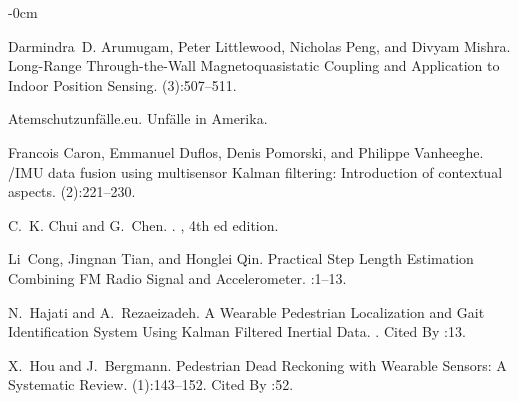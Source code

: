 \documentclass[engproc,conferenceproceedings,submit,pdftex,moreauthors]{Definitions/mdpi}
\begin{document}
\begin{adjustwidth}{-\extralength}{0cm}



%

\begin{thebibliography}{999}
Darmindra~D. Arumugam, Peter Littlewood, Nicholas Peng, and Divyam Mishra.
\newblock Long-{{Range Through-the-Wall Magnetoquasistatic Coupling}} and
{{Application}} to {{Indoor Position Sensing}}.
(3):507--511.

Atemschutzunfälle.eu.
\newblock Unfälle in {{Amerika}}.

Francois Caron, Emmanuel Duflos, Denis Pomorski, and Philippe Vanheeghe.
/{{IMU}} data fusion using multisensor {{Kalman}} filtering:
Introduction of contextual aspects.
(2):221--230.

C.~K. Chui and G.~Chen.
.
, 4th ed edition.

Li~Cong, Jingnan Tian, and Honglei Qin.
\newblock Practical {{Step Length Estimation Combining FM Radio Signal}} and
{{Accelerometer}}.
:1--13.

N.~Hajati and A.~Rezaeizadeh.
\newblock A {{Wearable Pedestrian Localization}} and {{Gait Identification
		System Using Kalman Filtered Inertial Data}}.
.
\newblock Cited By :13.

X.~Hou and J.~Bergmann.
\newblock Pedestrian {{Dead Reckoning}} with {{Wearable Sensors}}: {{A
		Systematic Review}}.
(1):143--152.
\newblock Cited By :52.


\end{thebibliography}
\end{adjustwidth}
\end{document}
